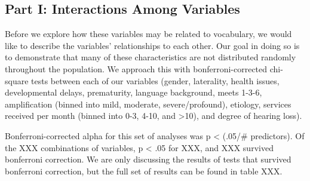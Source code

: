 \documentclass[english,man]{apa6}
\begin{document}
\hypertarget{part-i-interactions-among-variables}{%
\subsection{Part I: Interactions Among Variables}\label{part-i-interactions-among-variables}}

Before we explore how these variables may be related to vocabulary, we would like to describe the variables' relationships to each other. Our goal in doing so is to demonstrate that many of these characteristics are not distributed randomly throughout the population. We approach this with bonferroni-corrected chi-square tests between each of our variables (gender, laterality, health issues, developmental delays, prematurity, language background, meets 1-3-6, amplification (binned into mild, moderate, severe/profound), etiology, services received per month (binned into 0-3, 4-10, and \textgreater{}10), and degree of hearing loss).

Bonferroni-corrected alpha for this set of analyses was p \textless{} (.05/\# predictors). Of the XXX combinations of variables, p \textless{} .05 for XXX, and XXX survived bonferroni correction. We are only discussing the results of tests that survived bonferroni correction, but the full set of results can be found in table XXX.
\end{document}
